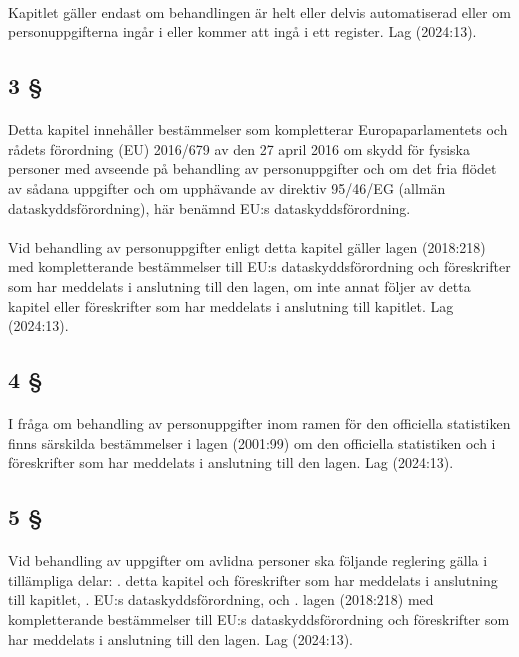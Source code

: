 \documentclass[a4paper,notitlepage,openany,10pt]{book}
\begin{document}
\paragraph*{}
Kapitlet gäller endast om behandlingen är helt eller delvis automatiserad eller om personuppgifterna ingår i eller kommer att ingå i ett register.
Lag (2024:13).
\subsection*{3 §}
\paragraph*{}
Detta kapitel innehåller bestämmelser som kompletterar Europaparlamentets och rådets förordning (EU) 2016/679 av den 27 april 2016 om skydd för fysiska personer med avseende på behandling av personuppgifter och om det fria flödet av sådana uppgifter och om upphävande av direktiv 95/46/EG (allmän dataskyddsförordning), här benämnd EU:s dataskyddsförordning.
\paragraph*{}
Vid behandling av personuppgifter enligt detta kapitel gäller lagen (2018:218) med kompletterande bestämmelser till EU:s dataskyddsförordning och föreskrifter som har meddelats i anslutning till den lagen, om inte annat följer av detta kapitel eller föreskrifter som har meddelats i anslutning till kapitlet.
Lag (2024:13).
\subsection*{4 §}
\paragraph*{}
I fråga om behandling av personuppgifter inom ramen för den officiella statistiken finns särskilda bestämmelser i lagen (2001:99) om den officiella statistiken och i föreskrifter som har meddelats i anslutning till den lagen.
Lag (2024:13).
\subsection*{5 §}
\paragraph*{}
Vid behandling av uppgifter om avlidna personer ska följande reglering gälla i tillämpliga delar:
. detta kapitel och föreskrifter som har meddelats i anslutning till kapitlet,
. EU:s dataskyddsförordning, och
. lagen (2018:218) med kompletterande bestämmelser till EU:s dataskyddsförordning och föreskrifter som har meddelats i anslutning till den lagen.
Lag (2024:13).
\end{document}
